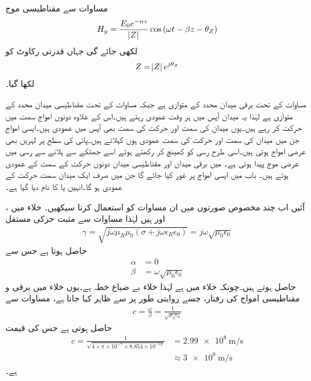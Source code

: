 مساوات  سے مقناطیسی موج
\begin{align}\label{مساوات_موج_عمومی_مقناطیسی}
H_y=\frac{E_0 e^{-\alpha z}}{\abs{Z}} \cos \left(\omega t - \beta z -\theta_{Z} \right)
\end{align}
لکھی جائے گی جہاں قدرتی رکاوٹ کو
\begin{align}
Z=\abs{Z} e^{j \theta_{Z}}
\end{align}
لکھا گیا۔

مساوات  کے تحت برقی میدان  محدد کے متوازی ہے جبکہ مساوات  کے تحت مقناطیسی میدان  محدد کے متوازی ہے لہٰذا یہ میدان  آپس میں ہر وقت عمودی رہتے ہیں۔اس کے علاوہ دونوں امواج  سمت میں حرکت کر رہے ہیں۔یوں میدان کی سمت اور حرکت کی سمت بھی آپس میں عمودی ہیں۔ایسی امواج جن میں میدان کی سمت اور حرکت کی سمت عمودی ہوں  کہلاتے ہیں۔پانی کی سطح پر لہریں بھی عرضی امواج ہوتی ہیں۔اسی طرح رسی کو کھینچ کر رکھتے ہوئے اسے جھٹکے  سے ہلانے سے  رسی میں عرضی موج پیدا ہوتی ہے۔ میں برقی میدان اور مقناطیسی میدان دونوں حرکت کے سمت کے عمودی ہوتے ہیں۔ باب  میں ایسی امواج پر غور کیا جائے گا جن میں صرف ایک میدان سمت حرکت کے عمودی ہو گا۔انہیں  یا  کا نام دیا گیا ہے۔ 

آئیں اب چند مخصوص صورتوں میں ان مساوات کو استعمال کرنا سیکھیں۔
خلاء میں ،  اور   ہیں لہٰذا مساوات  سے مثبت حرکی مستقل
\begin{align*}
\gamma=\sqrt{j \omega \mu_R \mu_0  \left(\sigma +j \omega \epsilon_R \epsilon_0 \right)}=j \omega \sqrt{\mu_0 \epsilon_0}
\end{align*}
حاصل ہوتا ہے جس سے
\begin{align*}
\alpha&=0\\
\beta&=\omega \sqrt{\mu_0 \epsilon_0}
\end{align*}
حاصل ہوتے ہیں۔چونکہ خلاء میں   ہے لہٰذا خلاء بے ضیاع خطہ ہے۔یوں خلاء میں برقی و مقناطیسی امواج کی رفتار، جسے روایتی طور پر  سے ظاہر کیا جاتا ہے،  مساوات  سے
\begin{align}
c=\frac{\omega}{\beta}=\frac{1}{\sqrt{\mu_0 \epsilon_0}}
\end{align}
حاصل ہوتی ہے جس کی قیمت
\begin{align*}
c=\frac{1}{\sqrt{4 \times \pi \times 10^{-7} \times 8.854 \times 10^{-12}}}&=\SI{2.99e8}{\meter \per \second} \\
&\approx \SI{3e8}{\meter \per \second}
\end{align*}
ہے۔

